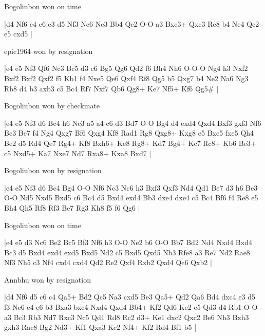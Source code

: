 \showboard

Bogoliubon won on time

\makegametitle
|d4 Nf6 c4 e6 e3 d5 Nf3 Nc6 Nc3 Bb4 Qc2 O-O a3 Bxc3+ Qxc3 Re8 b4 Ne4 Qc2 e5 cxd5  |

\showboard

epic1964 won by resignation

\makegametitle
|e4 e5 Nf3 Qf6 Nc3 Bc5 d3 c6 Bg5 Qg6 Qd2 f6 Bh4 Nh6 O-O-O Ng4 h3 Nxf2 Bxf2 Bxf2 Qxf2 f5 Kb1 f4 Nxe5 Qe6 Qxf4 Rf8 Qg5 b5 Qxg7 b4 Ne2 Na6 Ng3 Rb8 d4 b3 axb3 c5 Bc4 Rf7 Nxf7 Qb6 Qg8+ Ke7 Nf5+ Kf6 Qg5\#  |

\showboard

Bogoliubon won by checkmate

\makegametitle
|e4 e5 Nf3 d6 Bc4 h6 Nc3 a5 a4 c6 d3 Bd7 O-O Bg4 d4 exd4 Qxd4 Bxf3 gxf3 Nf6 Be3 Be7 f4 Ng4 Qxg7 Bf6 Qxg4 Kf8 Rad1 Rg8 Qxg8+ Kxg8 e5 Bxe5 fxe5 Qh4 Be2 d5 Rd4 Qe7 Rg4+ Kf8 Bxh6+ Ke8 Rg8+ Kd7 Bg4+ Kc7 Rc8+ Kb6 Be3+ c5 Nxd5+ Ka7 Nxe7 Nd7 Rxa8+ Kxa8 Bxd7  |

\showboard

Bogoliubon won by resignation

\makegametitle
|e4 e5 Nf3 d6 Bc4 Bg4 O-O Nf6 Nc3 Nc6 h3 Bxf3 Qxf3 Nd4 Qd1 Be7 d3 h6 Be3 O-O Nd5 Nxd5 Bxd5 c6 Bc4 d5 Bxd4 exd4 Bb3 dxe4 dxe4 c5 Bc4 Bf6 f4 Re8 e5 Bh4 Qh5 Rf8 Rf3 Be7 Rg3 Kh8 f5 f6 Qg6  |

\showboard

Bogoliubon won on time

\makegametitle
|e4 e5 d3 Nc6 Be2 Bc5 Bf3 Nf6 h3 O-O Ne2 b6 O-O Bb7 Bd2 Nd4 Nxd4 Bxd4 Bc3 d5 Bxd4 exd4 exd5 Bxd5 Nd2 c5 Bxd5 Qxd5 Nb3 Rfe8 a3 Re7 Nd2 Rae8 Nf3 Nh5 c3 Nf4 cxd4 cxd4 Qd2 Re2 Qxf4 Rxb2 Qxd4 Qe6 Qxb2  |

\showboard

Annbhu won by resignation

\makegametitle
|d4 Nf6 d5 c6 c4 Qa5+ Bd2 Qc5 Na3 cxd5 Be3 Qa5+ Qd2 Qa6 Bd4 dxc4 e3 d5 f3 Nc6 e4 e6 b3 Bxa3 bxc4 Nxd4 Qxd4 Bb4+ Kf2 Qd6 Ke2 e5 Qd3 d4 Rb1 O-O a3 Bc3 Rb3 Nd7 Rxc3 Nc5 Qd1 Rd8 Rc2 d3+ Ke1 dxc2 Qxc2 Be6 Nh3 Bxh3 gxh3 Rac8 Bg2 Nd3+ Kf1 Qxa3 Ke2 Nf4+ Kf2 Rd4 Bf1 b5  |


